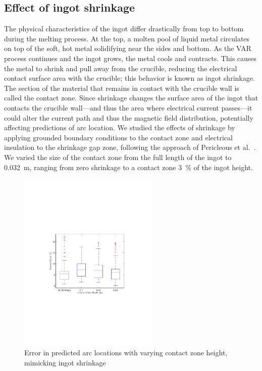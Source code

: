 \documentclass[onehalf,11pt]{beavtex}
\begin{document}
\subsection{Effect of ingot shrinkage}
\label{sec:shrinkage}

The physical characteristics of the ingot differ drastically from top to bottom during the melting process.
At the top, a molten pool of liquid metal circulates on top of the soft, hot metal solidifying near the sides and bottom. 
As the VAR process continues and the ingot grows, the metal cools and contracts.
This causes the metal to shrink and pull away from the crucible, reducing the electrical contact surface area with the crucible; this behavior is known as ingot shrinkage.
The section of the material that remains in contact with the crucible wall is called the contact zone.
Since shrinkage changes the surface area of the ingot that contacts the crucible wall---and thus the area where electrical current passes---it could alter the current path and thus the magnetic field distribution, potentially affecting predictions of arc location.
We studied the effects of shrinkage by applying grounded boundary conditions to the contact zone and electrical insulation to the shrinkage gap zone, following the approach of Pericleous et al.~\cite{Pericleous:2013kb}.
We varied the size of the contact zone from the full length of the ingot to \SI{0.032}{\meter}, ranging from zero shrinkage to a contact zone \SI{3}{\percent} of the ingot height.

\begin{figure}[htbp]
\centering
	\includegraphics[width=0.6\textwidth]{shrinkage_study_error.pdf}
	\caption{Error in predicted arc locations with varying contact zone height, mimicking ingot shrinkage}
	\label{fig:shrinkage}
\end{figure}
\end{document}
